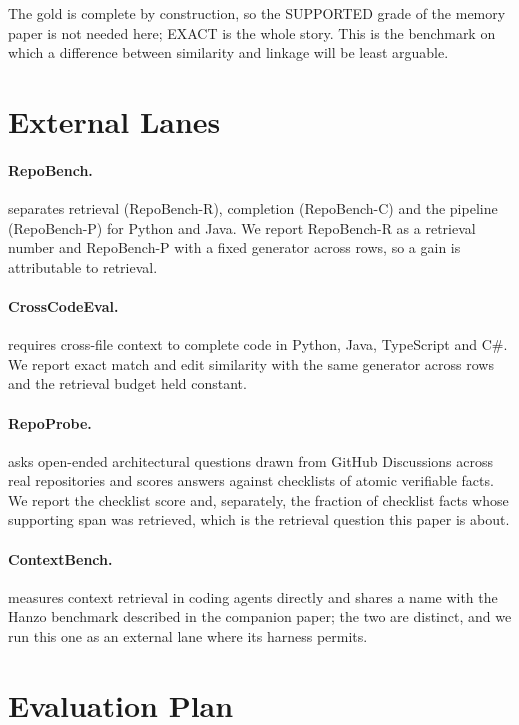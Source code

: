 \documentclass[11pt]{article}
\begin{document}
The gold is complete by construction, so the SUPPORTED grade of the memory
paper is not needed here; EXACT is the whole story. This is the benchmark on
which a difference between similarity and linkage will be least arguable.

\section{External Lanes}

\paragraph{RepoBench.} \cite{repobench} separates retrieval (RepoBench-R),
completion (RepoBench-C) and the pipeline (RepoBench-P) for Python and Java.
We report RepoBench-R as a retrieval number and RepoBench-P with a fixed
generator across rows, so a gain is attributable to retrieval.

\paragraph{CrossCodeEval.} \cite{crosscodeeval} requires cross-file context
to complete code in Python, Java, TypeScript and C\#. We report exact match
and edit similarity with the same generator across rows and the retrieval
budget held constant.

\paragraph{RepoProbe.} \cite{repoprobe} asks open-ended architectural
questions drawn from GitHub Discussions across real repositories and scores
answers against checklists of atomic verifiable facts. We report the
checklist score and, separately, the fraction of checklist facts whose
supporting span was retrieved, which is the retrieval question this paper
is about.

\paragraph{ContextBench.} \cite{contextbench} measures context retrieval in
coding agents directly and shares a name with the Hanzo benchmark described
in the companion paper; the two are distinct, and we run this one as an
external lane where its harness permits.

\section{Evaluation Plan}
\end{document}
